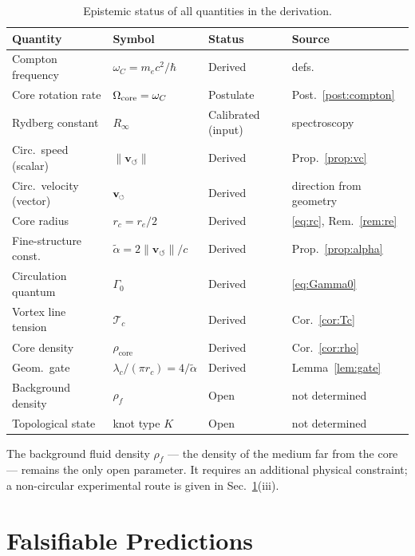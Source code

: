 \documentclass[aps,pra,preprint,longbibliography,nofootinbib]{revtex4-2}
\newcommand{\rotarrow}{%
  \mathchoice{\mkern-2mu\scriptstyle\boldsymbol{\circlearrowleft}}%
             {\mkern-2mu\scriptstyle\boldsymbol{\circlearrowleft}}%
             {\mkern-2mu\scriptscriptstyle\boldsymbol{\circlearrowleft}}%
             {\mkern-2mu\scriptscriptstyle\boldsymbol{\circlearrowleft}}}
\newcommand{\vc}{\mathbf{v}_{\rotarrow}}        %
\newcommand{\vnorm}{\lVert\mathbf{v}_{\!\boldsymbol{\circlearrowleft}}\rVert} %
\newcommand{\rhof}{\rho_{\!f}}                   %
\newcommand{\rhocore}{\rho_{\mathrm{core}}}      %
\newcommand{\rc}{r_c}                            %
\newcommand{\omC}{\omega_C}                      %
\newcommand{\lc}{\lambda_c}                      %
\newcommand{\Rinf}{R_\infty}                     %
\newcommand{\Tc}{\mathcal{T}_c}                  %
\newcommand{\Gz}{\Gamma_0}                       %
\begin{document}
\begin{table}[h]
\centering
\caption{Epistemic status of all quantities in the derivation.}
\label{tab:status}
\begin{tabular}{llll}
\toprule
Quantity & Symbol & Status & Source \\
\midrule
Compton frequency    & $\omC = m_e c^2/\hbar$    & Derived   & defs.~\cite{MohrTaylor2018} \\
Core rotation rate   & $\Omega_{\rm core}=\omC$  & Postulate & Post.~\ref{post:compton} \\
Rydberg constant     & $\Rinf$                   & Calibrated (input) & spectroscopy~\cite{MohrTaylor2018} \\
Circ.\ speed (scalar)& $\vnorm$                  & Derived   & Prop.~\ref{prop:vc} \\
Circ.\ velocity (vector)& $\vc$                  & Derived   & direction from geometry \\
Core radius          & $\rc = r_e/2$             & Derived   & \eqref{eq:rc}, Rem.~\ref{rem:re} \\
Fine-structure const.& $\tilde\alpha = 2\vnorm/c$& Derived   & Prop.~\ref{prop:alpha} \\
Circulation quantum  & $\Gz$                     & Derived   & \eqref{eq:Gamma0} \\
Vortex line tension  & $\Tc$                     & Derived   & Cor.~\ref{cor:Tc} \\
Core density         & $\rhocore$                & Derived   & Cor.~\ref{cor:rho} \\
Geom.\ gate          & $\lc/(\pi\rc)=4/\tilde\alpha$ & Derived & Lemma~\ref{lem:gate} \\
Background density   & $\rhof$                   & Open      & not determined \\
Topological state    & knot type $K$             & Open      & not determined \\
\bottomrule
\end{tabular}
\end{table}

The background fluid density $\rhof$ — the density of the medium
far from the core — remains the only open parameter.
It requires an additional physical constraint; a non-circular
experimental route is given in Sec.~\ref{sec:falsifiers}(iii).

\section{Falsifiable Predictions}
\label{sec:falsifiers}
\end{document}
